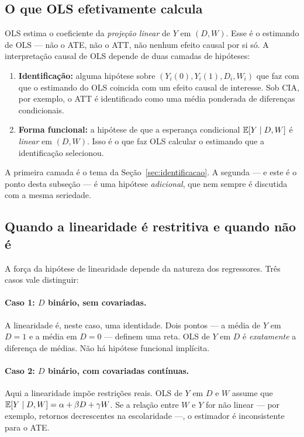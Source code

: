 \subsection*{O que OLS efetivamente calcula}

OLS estima o coeficiente da \textit{projeção linear} de $Y$ em $(D, W)$. Esse é o estimando de OLS --- não o ATE, não o ATT, não nenhum efeito causal por si só. A interpretação causal de OLS depende de duas camadas de hipóteses:
\begin{enumerate}
  \item \textbf{Identificação:} alguma hipótese sobre $(Y_i(0), Y_i(1), D_i, W_i)$ que faz com que o estimando do OLS coincida com um efeito causal de interesse. Sob CIA, por exemplo, o ATT é identificado como uma média ponderada de diferenças condicionais.
  \item \textbf{Forma funcional:} a hipótese de que a esperança condicional $\mathbb{E}[Y \mid D, W]$ é \textit{linear} em $(D, W)$. Isso é o que faz OLS calcular o estimando que a identificação selecionou.
\end{enumerate}

A primeira camada é o tema da Seção~\ref{sec:identificacao}. A segunda --- e este é o ponto desta subseção --- é uma hipótese \textit{adicional}, que nem sempre é discutida com a mesma seriedade.

\subsection*{Quando a linearidade é restritiva e quando não é}

A força da hipótese de linearidade depende da natureza dos regressores. Três casos vale distinguir:

\paragraph{Caso 1: $D$ binário, sem covariadas.} A linearidade é, neste caso, uma identidade. Dois pontos --- a média de $Y$ em $D = 1$ e a média em $D = 0$ --- definem uma reta. OLS de $Y$ em $D$ é \textit{exatamente} a diferença de médias. Não há hipótese funcional implícita.

\paragraph{Caso 2: $D$ binário, com covariadas contínuas.} Aqui a linearidade impõe restrições reais. OLS de $Y$ em $D$ e $W$ assume que $\mathbb{E}[Y \mid D, W] = \alpha + \beta D + \gamma W$. Se a relação entre $W$ e $Y$ for não linear --- por exemplo, retornos decrescentes na escolaridade ---, o estimador é inconsistente para o ATE.

